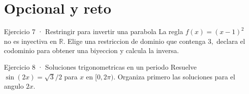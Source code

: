 \documentclass[10pt,a4paper,oneside,openany]{book}
\begin{document}
\section*{Opcional y reto}
\begin{PSevenOptionalFixed}{Ejercicio 7 · Restringir para invertir una parabola}
La regla \(f(x)=(x-1)^{2}\) no es inyectiva en \(\mathbb{R}\). Elige una restriccion de dominio que contenga \(3,\) declara el codominio para obtener una biyeccion y calcula la inversa.
\end{PSevenOptionalFixed}
\begin{PSevenOptionalFixed}{Ejercicio 8 · Soluciones trigonometricas en un periodo}
Resuelve \(\sin(2x)=\sqrt{3}/2\) para \(x\) en \([0,2\pi )\). Organiza primero las soluciones para el angulo \(2x\).
\end{PSevenOptionalFixed}
\end{document}
